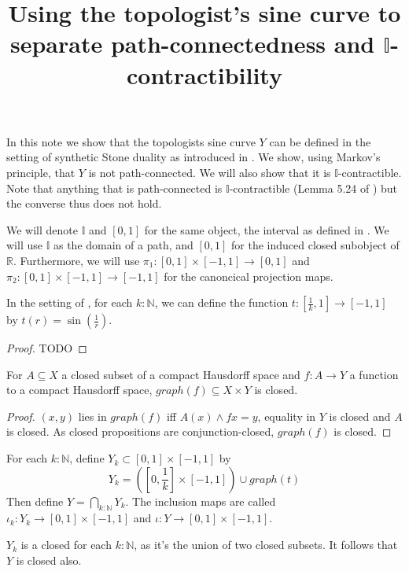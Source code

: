 \documentclass{../util/zariski}
\title{Using the topologist's sine curve to separate path-connectedness and $\mathbb I$-contractibility}
\begin{document}
In this note we show that the topologists sine curve $Y$ can be defined in the setting of 
synthetic Stone duality as introduced in \cite{synthetic-stone-duality}. 
We show, using Markov's principle, that $Y$ is not path-connected. 
We will also show that it is $\mathbb I$-contractible. 
Note that anything that is path-connected is $\mathbb I$-contractible 
(Lemma 5.24 of \cite{synthetic-stone-duality}) but the converse thus does not hold. 


\begin{remark}[on notation]
  We will denote $\mathbb I$ and $[0,1]$ for the same object, the interval as defined in \cite{synthetic-stone-duality}. 
  We will use $\mathbb I$ as the domain of a path, and $[0,1]$ for the induced closed subobject of $\mathbb R$. 
  Furthermore, we will use $\pi_1 : [0,1] \times [-1,1] \to [0,1] $ and $\pi_2: [0,1] \times [-1,1] \to [-1,1]$ 
  for the canoncical projection maps. 
\end{remark}

\begin{lemma}
  In the setting of \cite{synthetic-stone-duality}, 
  for each $k:\mathbb N$, we can define the function 
  $t:[\frac1k, 1] \to [-1,1]$ by $t(r) = \sin(\frac1r)$.
\end{lemma}
\begin{proof}
  TODO
\end{proof}

\begin{lemma}
  For $A\subseteq X$ a closed subset of a compact Hausdorff space and 
  $f: A \to Y$ a function to a compact Hausdorff space, 
  $graph(f) \subseteq X \times Y$ is closed. 
\end{lemma}
\begin{proof}
  $(x,y)$ lies in $graph(f)$ iff $A(x) \wedge f x = y$, 
  equality in $Y$ is closed and $A$ is closed. 
  As closed propositions are conjunction-closed, $graph(f)$ is closed. 
\end{proof}
\begin{definition}
  For each $k:\mathbb N$, define $Y_k \subset [0,1] \times [-1,1]$ by 
  $$Y_k = ([0, \frac1k] \times [-1,1]) \cup graph(t)$$
  Then define $Y = \bigcap_{k:\mathbb N} Y_k$. 
  The inclusion maps are called $\iota_k : Y_k \to [0,1] \times [-1,1]$ 
  and $\iota:Y \to [0,1] \times [-1,1]$. 
\end{definition}
\begin{remark}
  $Y_k$ is a closed for each $k:\mathbb N$, 
  as it's the union of two closed subsets. 
  It follows that $Y$ is closed also. 
\end{remark}
\end{document}
